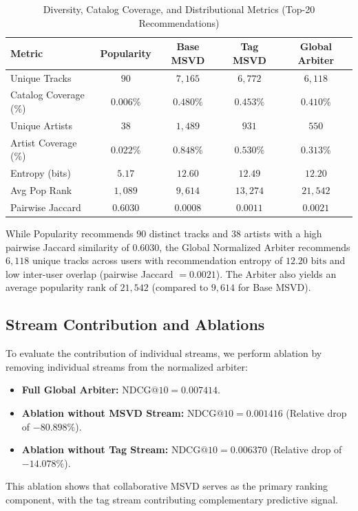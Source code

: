 \documentclass[conference]{IEEEtran}
\begin{document}
\begin{table}[t]
\caption{Diversity, Catalog Coverage, and Distributional Metrics (Top-20 Recommendations)}
\label{tab:diversity}
\centering
\begin{tabular}{lcccc}
\toprule
\textbf{Metric} & \textbf{Popularity} & \textbf{Base MSVD} & \textbf{Tag MSVD} & \textbf{Global Arbiter} \\
\midrule
Unique Tracks & $90$ & $7,165$ & $6,772$ & $6,118$ \\
Catalog Coverage (\%) & $0.006\%$ & $0.480\%$ & $0.453\%$ & $0.410\%$ \\
Unique Artists & $38$ & $1,489$ & $931$ & $550$ \\
Artist Coverage (\%) & $0.022\%$ & $0.848\%$ & $0.530\%$ & $0.313\%$ \\
Entropy (bits) & $5.17$ & $12.60$ & $12.49$ & $12.20$ \\
Avg Pop Rank & $1,089$ & $9,614$ & $13,274$ & $21,542$ \\
Pairwise Jaccard & $0.6030$ & $0.0008$ & $0.0011$ & $0.0021$ \\
\bottomrule
\end{tabular}
\end{table}

While Popularity recommends $90$ distinct tracks and $38$ artists with a high pairwise Jaccard similarity of $0.6030$, the Global Normalized Arbiter recommends $6,118$ unique tracks across users with recommendation entropy of $12.20\text{ bits}$ and low inter-user overlap (pairwise Jaccard $= 0.0021$). The Arbiter also yields an average popularity rank of $21,542$ (compared to $9,614$ for Base MSVD).

\subsection{Stream Contribution and Ablations}
To evaluate the contribution of individual streams, we perform ablation by removing individual streams from the normalized arbiter:
\begin{itemize}
    \item \textbf{Full Global Arbiter:} $\text{NDCG@10} = 0.007414$.
    \item \textbf{Ablation without MSVD Stream:} $\text{NDCG@10} = 0.001416$ (Relative drop of $-80.898\%$).
    \item \textbf{Ablation without Tag Stream:} $\text{NDCG@10} = 0.006370$ (Relative drop of $-14.078\%$).
\end{itemize}
This ablation shows that collaborative MSVD serves as the primary ranking component, with the tag stream contributing complementary predictive signal.
\end{document}
